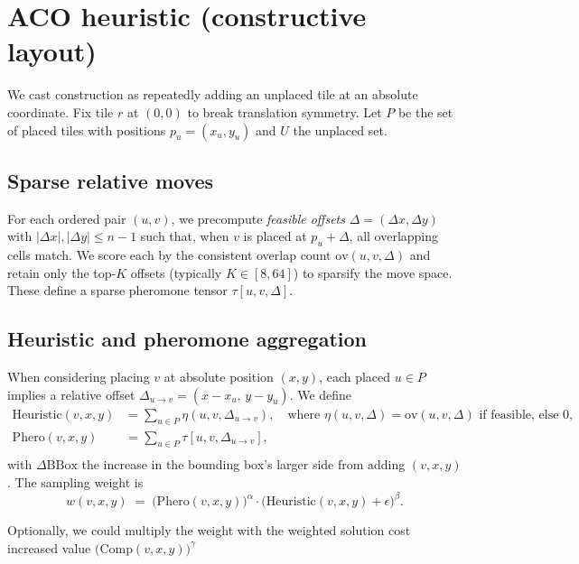 \documentclass[11pt]{article}
\begin{document}
\section{ACO heuristic (constructive layout)}
We cast construction as repeatedly adding an unplaced tile at an absolute coordinate. Fix tile $r$ at $(0,0)$ to break translation symmetry. Let $P$ be the set of placed tiles with positions $p_u=(x_u,y_u)$ and $U$ the unplaced set.

\subsection{Sparse relative moves}
For each ordered pair $(u,v)$, we precompute \emph{feasible offsets} $\Delta=(\Delta x,\Delta y)$ with $|\Delta x|,|\Delta y|\le n-1$ such that, when $v$ is placed at $p_u+\Delta$, all overlapping cells match. We score each by the consistent overlap count $\mathrm{ov}(u,v,\Delta)$ and retain only the top-$K$ offsets (typically $K\in[8,64]$) to sparsify the move space. These define a sparse pheromone tensor $\tau[u,v,\Delta]$.

\subsection{Heuristic and pheromone aggregation}
When considering placing $v$ at absolute position $(x,y)$, each placed $u\in P$ implies a relative offset $\Delta_{u\to v}=(x-x_u,\,y-y_u)$. We define
\begin{align*}
\mathrm{Heuristic}(v,x,y) &= \sum_{u\in P} \eta(u,v,\Delta_{u\to v}), \quad \text{where } \eta(u,v,\Delta)=\mathrm{ov}(u,v,\Delta)\text{ if feasible, else }0,\\
\mathrm{Phero}(v,x,y) &= \sum_{u\in P} \tau[u,v,\Delta_{u\to v}],\\
\end{align*}
with $\Delta\mathrm{BBox}$ the increase in the bounding box's larger side from adding $(v,x,y)$. The sampling weight is
\begin{equation}
 w(v,x,y) \;=\; \big(\mathrm{Phero}(v,x,y)\big)^{\alpha}\cdot\big(\mathrm{Heuristic}(v,x,y)+\epsilon\big)^{\beta}.%
\end{equation}

Optionally, we could multiply the weight with the weighted solution cost increased value $\big(\mathrm{Comp}(v,x,y)\big)^{\gamma}$
\end{document}
